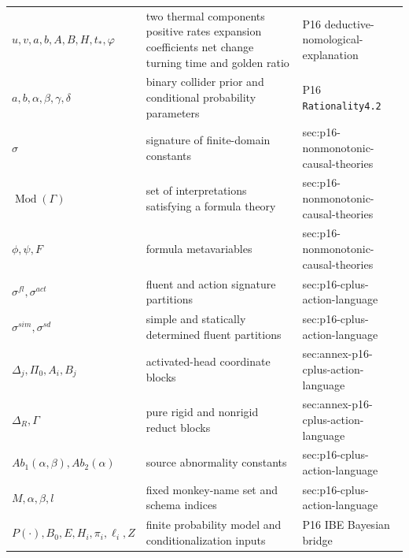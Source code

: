 \begin{longtable}{@{}p{}p{}p{}@{}}
\(u,\allowbreak v,\allowbreak a,\allowbreak b,\allowbreak A,\allowbreak B,\allowbreak H,\allowbreak t_*,\allowbreak \varphi\) & two thermal components positive rates expansion coefficients net change turning time and golden ratio & P16 deductive-\allowbreak{}nomological-\allowbreak{}explanation \\
\(a,\allowbreak b,\allowbreak \alpha,\allowbreak \beta,\allowbreak \gamma,\allowbreak \delta\) & binary collider prior and conditional probability parameters & P16 \texttt{Rationality4.\allowbreak{}2} \\
\(\sigma\) & signature of finite-domain constants & sec:\allowbreak{}p16-\allowbreak{}nonmonotonic-\allowbreak{}causal-\allowbreak{}theories \\
\(\operatorname{Mod}(\Gamma)\) & set of interpretations satisfying a formula theory & sec:\allowbreak{}p16-\allowbreak{}nonmonotonic-\allowbreak{}causal-\allowbreak{}theories \\
\(\phi,\allowbreak \psi,\allowbreak F\) & formula metavariables & sec:\allowbreak{}p16-\allowbreak{}nonmonotonic-\allowbreak{}causal-\allowbreak{}theories \\
\(\sigma^{fl},\allowbreak \sigma^{act}\) & fluent and action signature partitions & sec:\allowbreak{}p16-\allowbreak{}cplus-\allowbreak{}action-\allowbreak{}language \\
\(\sigma^{sim},\allowbreak \sigma^{sd}\) & simple and statically determined fluent partitions & sec:\allowbreak{}p16-\allowbreak{}cplus-\allowbreak{}action-\allowbreak{}language \\
\(\Delta_j,\allowbreak \Pi_0,\allowbreak A_i,\allowbreak B_j\) & activated-head coordinate blocks & sec:\allowbreak{}annex-\allowbreak{}p16-\allowbreak{}cplus-\allowbreak{}action-\allowbreak{}language \\
\(\Delta_R,\allowbreak \Gamma\) & pure rigid and nonrigid reduct blocks & sec:\allowbreak{}annex-\allowbreak{}p16-\allowbreak{}cplus-\allowbreak{}action-\allowbreak{}language \\
\(Ab_1(\alpha,\allowbreak \beta),\allowbreak Ab_2(\alpha)\) & source abnormality constants & sec:\allowbreak{}p16-\allowbreak{}cplus-\allowbreak{}action-\allowbreak{}language \\
\(M,\allowbreak \alpha,\allowbreak \beta,\allowbreak l\) & fixed monkey-name set and schema indices & sec:\allowbreak{}p16-\allowbreak{}cplus-\allowbreak{}action-\allowbreak{}language \\
\(P(\cdot),\allowbreak B_0,\allowbreak E,\allowbreak H_i,\allowbreak \pi_i,\allowbreak \ell_i,\allowbreak Z\) & finite probability model and conditionalization inputs & P16 IBE Bayesian bridge \\

\end{longtable}
